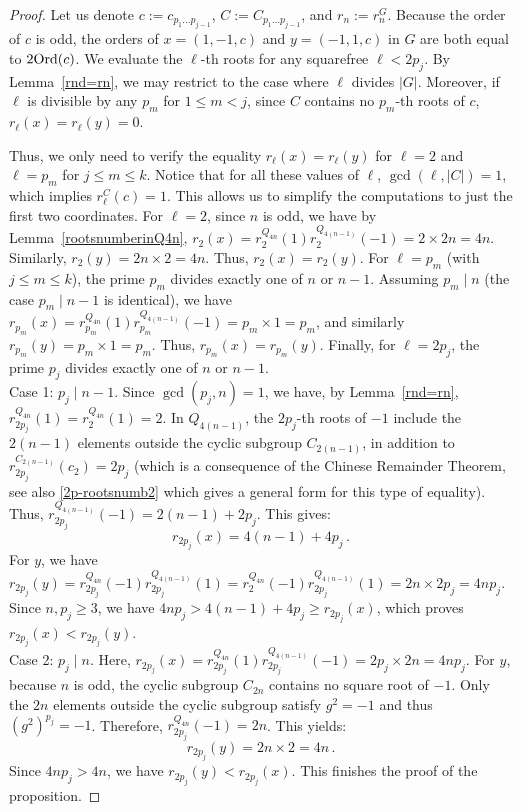 \documentclass[12pt]{amsart}
\numberwithin{equation}{section}
\newcommand{\Ord}{{\rm Ord}}
\theoremstyle{definition}
\theoremstyle{remark}
\begin{document}
\begin{proof}
    Let us denote $c := c_{p_1\dots p_{j-1}}$, $C := C_{p_1\dots p_{j-1}}$, and $r_n:=r_n^G$. Because the order of $c$ is odd, the orders of $x=(1,-1,c)$ and $y=(-1,1,c)$ in $G$ are both equal to $2\Ord(c)$. We evaluate the $\ell$-th roots for any squarefree $\ell < 2p_j$. By Lemma~\ref{rnd=rn}, we may restrict to the case where $\ell$ divides $|G|$. Moreover, if $\ell$ is divisible by any $p_m$ for $1 \le m < j$, since $C$ contains no $p_m$-th roots of $c$, $r_\ell(x) = r_\ell(y) = 0$. 
    
    Thus, we only need to verify the equality $r_\ell(x) = r_\ell(y)$ for $\ell=2$ and $\ell=p_m$ for $j \le m \le k$. Notice that for all these values of $\ell$, $\gcd(\ell, |C|) = 1$, which implies $r_\ell^C(c) = 1$. This allows us to simplify the computations to just the first two coordinates. For $\ell=2$, since $n$ is odd, we have by Lemma~\ref{rootsnumberinQ4n}, $r_2(x) = r_2^{Q_{4n}}(1) r_2^{Q_{4(n-1)}}(-1) = 2\times 2n = 4n$. Similarly, $r_2(y) = 2n\times 2= 4n$. Thus, $r_2(x) = r_2(y)$. For $\ell=p_m$ (with $j \le m \le k$), the prime $p_m$ divides exactly one of $n$ or $n-1$. Assuming $p_m \mid n$ (the case $p_m \mid n-1$ is identical), we have $r_{p_m}(x) = r_{p_m}^{Q_{4n}}(1)r_{p_m}^{Q_{4(n-1)}}(-1)= p_m\times 1 = p_m$, and similarly $r_{p_m}(y) = p_m\times 1 = p_m$. Thus, $r_{p_m}(x) = r_{p_m}(y)$. Finally, for $\ell=2p_j$, the prime $p_j$ divides exactly one of $n$ or $n-1$. \\
    Case 1: $p_j \mid n-1$. 
    Since $\gcd(p_j, n) = 1$, we have, by Lemma~\ref{rnd=rn}, $r_{2p_j}^{Q_{4n}}(1) = r_2^{Q_{4n}}(1) = 2$. In $Q_{4(n-1)}$, the $2p_j$-th roots of $-1$ include the $2(n-1)$ elements outside the cyclic subgroup $C_{2(n-1)}$, in addition to $r_{2p_j}^{C_{2(n-1)}}(c_2)=2p_j$ (which is a consequence of the Chinese Remainder Theorem, see also \eqref{2p-rootsnumb2} which gives a general form for this type of equality). Thus, $r_{2p_j}^{Q_{4(n-1)}}(-1) = 2(n-1) + 2p_j$. This gives:
    \[ r_{2p_j}(x) = 4(n-1) + 4p_j\, . \]
    For $y$, we have $r_{2p_j}(y) = r_{2p_j}^{Q_{4n}}(-1) r_{2p_j}^{Q_{4(n-1)}}(1) = r_{2}^{Q_{4n}}(-1) r_{2p_j}^{Q_{4(n-1)}}(1)=2n\times 2p_j = 4np_j$. Since $n, p_j \ge 3$, we have $4np_j > 4(n-1) + 4p_j \ge r_{2p_j}(x)$, which proves $r_{2p_j}(x) < r_{2p_j}(y)$.\\
    Case 2: $p_j \mid n$. 
    Here, $r_{2p_j}(x) = r_{2p_j}^{Q_{4n}}(1) r_{2p_j}^{Q_{4(n-1)}}(-1) = 2p_j\times 2n = 4np_j$. For $y$, because $n$ is odd, the cyclic subgroup $C_{2n}$ contains no square root of $-1$. Only the $2n$ elements outside the cyclic subgroup satisfy $g^2=-1$ and thus $(g^2)^{p_j}=-1$. Therefore, $r_{2p_j}^{Q_{4n}}(-1) = 2n$. This yields:
    \[ r_{2p_j}(y) = 2n\times 2 = 4n\, . \]
    Since $4np_j > 4n$, we have $r_{2p_j}(y) < r_{2p_j}(x)$. This finishes the proof of the proposition.
\end{proof}
\end{document}
